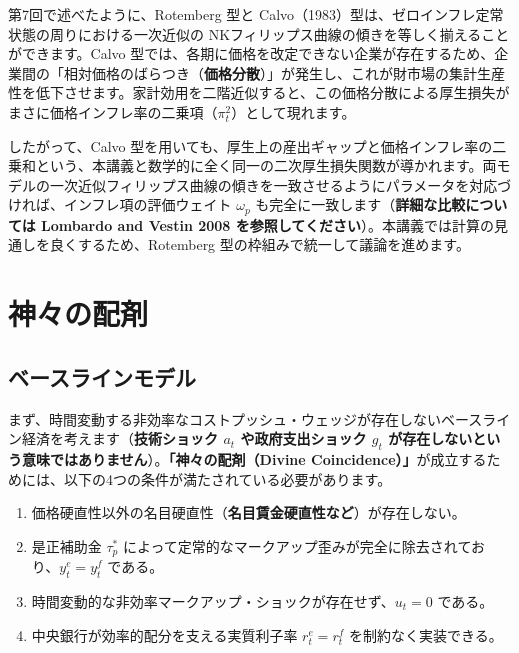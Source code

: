 \documentclass[
  japanese,
  lualatex,
  ja=standard,
  12pt,
  a4paper]{ltjsarticle}
\providecommand{\tightlist}{%
  \setlength{\itemsep}{0pt}\setlength{\parskip}{0pt}}
\begin{document}
\begin{tcolorbox}[enhanced jigsaw, arc=.35mm, bottomrule=.15mm, bottomtitle=1mm, breakable, colback=white, colbacktitle=quarto-callout-note-color!10!white, colframe=quarto-callout-note-color-frame, coltitle=black, left=2mm, leftrule=.75mm, opacityback=0, opacitybacktitle=0.6, rightrule=.15mm, title=\textcolor{quarto-callout-note-color}{\faInfo}\hspace{0.5em}{\textbf{補足：Calvo 型価格硬直性における厚生損失の一致}}, titlerule=0mm, toprule=.15mm, toptitle=1mm]

第7回で述べたように、Rotemberg 型と
Calvo（1983）型は、ゼロインフレ定常状態の周りにおける一次近似の
NKフィリップス曲線の傾きを等しく揃えることができます。Calvo
型では、各期に価格を改定できない企業が存在するため、企業間の「相対価格のばらつき（\textbf{価格分散}）」が発生し、これが財市場の集計生産性を低下させます。家計効用を二階近似すると、この価格分散による厚生損失がまさに価格インフレ率の二乗項（\textbf{\(\pi_t^2\)}）として現れます。

したがって、Calvo
型を用いても、厚生上の産出ギャップと価格インフレ率の二乗和という、本講義と数学的に全く同一の二次厚生損失関数が導かれます。両モデルの一次近似フィリップス曲線の傾きを一致させるようにパラメータを対応づければ、インフレ項の評価ウェイト
\(\omega_p\) も完全に一致します（\textbf{詳細な比較については Lombardo
and Vestin 2008
を参照してください}）。本講義では計算の見通しを良くするため、Rotemberg
型の枠組みで統一して議論を進めます。

\end{tcolorbox}

\section{神々の配剤}\label{ux795eux3005ux306eux914dux5264}

\subsection{ベースラインモデル}\label{ux30d9ux30fcux30b9ux30e9ux30a4ux30f3ux30e2ux30c7ux30eb}

まず、時間変動する非効率なコストプッシュ・ウェッジが存在しないベースライン経済を考えます（\textbf{技術ショック
\(a_t\) や政府支出ショック \(g_t\)
が存在しないという意味ではありません}）。\textbf{「神々の配剤（Divine
Coincidence）」}が成立するためには、以下の4つの条件が満たされている必要があります。

\begin{enumerate}
\def\labelenumi{\arabic{enumi}.}
\tightlist
\item
  価格硬直性以外の名目硬直性（\textbf{名目賃金硬直性など}）が存在しない。
\item
  是正補助金 \(\tau_p^*\)
  によって定常的なマークアップ歪みが完全に除去されており、\(y_t^e=y_t^f\)
  である。
\item
  時間変動的な非効率マークアップ・ショックが存在せず、\(u_t=0\) である。
\item
  中央銀行が効率的配分を支える実質利子率 \(r_t^e=r_t^f\)
  を制約なく実装できる。
\end{enumerate}
\end{document}

